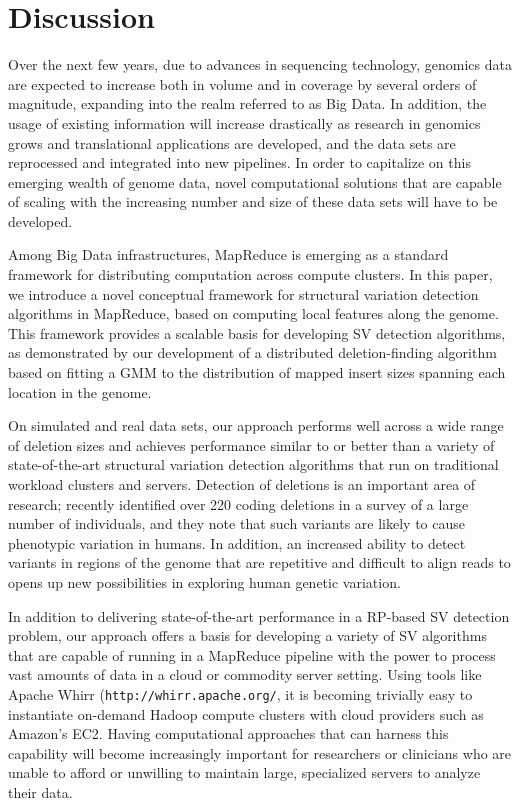 \documentclass[11pt]{article}
\begin{document}
\section{Discussion}\label{Discussion}

Over the next few years, due to advances in sequencing technology, genomics data are expected to increase both in volume and in coverage by several orders of magnitude, expanding into the realm referred to as Big Data. In addition, the usage of existing information will increase drastically as research in genomics grows and translational applications are developed, and the data sets are reprocessed and integrated into new pipelines. In order to capitalize on this emerging wealth of genome data, novel computational solutions that are capable of scaling with the increasing number and size of these data sets will have to be developed. 

Among Big Data infrastructures, MapReduce is emerging as a standard framework for distributing computation across compute clusters. In this paper, we introduce a novel conceptual framework for structural variation detection algorithms in MapReduce, based on computing local features along the genome. This framework provides a scalable basis for developing SV detection algorithms, as demonstrated by our development of a distributed deletion-finding algorithm based on fitting a GMM to the distribution of mapped insert sizes spanning each location in the genome. 

On simulated and real data sets, our approach performs well across a wide range of deletion sizes and achieves performance similar to or better than a variety of state-of-the-art structural variation detection algorithms that run on traditional workload clusters and servers. Detection of deletions is an important area of research; \textcite{Mills:2011fi} recently identified over 220 coding deletions in a survey of a large number of individuals, and they note that such variants are likely to cause phenotypic variation in humans. In addition, an increased ability to detect variants in regions of the genome that are repetitive and difficult to align reads to opens up new possibilities in exploring human genetic variation.

In addition to delivering state-of-the-art performance in a RP-based SV detection problem, our approach offers a basis for developing a variety of SV algorithms that are capable of running in a MapReduce pipeline with the power to process vast amounts of data in a cloud or commodity server setting. Using tools like Apache Whirr (\texttt{http://whirr.apache.org/}, it is becoming trivially easy to instantiate on-demand Hadoop compute clusters with cloud providers such as Amazon's EC2. Having computational approaches that can harness this capability will become increasingly important for researchers or clinicians who are unable to afford or unwilling to maintain large, specialized servers to analyze their data.
\end{document}
